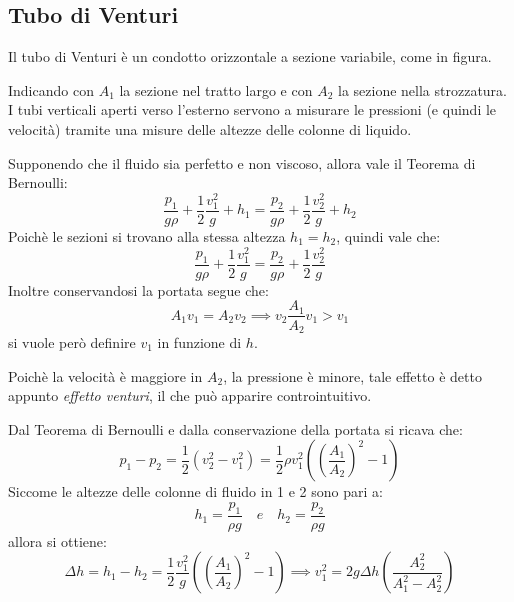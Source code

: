 \documentclass[11pt, a4paper, openright]{book}
\theoremstyle{plain}
\theoremstyle{definition}
\begin{document}
\newpage

\subsection{Tubo di Venturi}
Il tubo di Venturi è un condotto orizzontale a sezione variabile, come in figura.

Indicando con $A_1$ la sezione nel tratto largo e con $A_2$ la sezione nella strozzatura. I tubi verticali aperti verso l'esterno servono a misurare le pressioni (e quindi le velocità) tramite una misure delle altezze delle colonne di liquido.

Supponendo che il fluido sia perfetto e non viscoso, allora vale il Teorema di Bernoulli:
\begin{equation}
    \frac{p_1}{g\rho} + \frac{1}{2}\frac{v_1^2}{g} + h_1 =\frac{p_2}{g\rho} + \frac{1}{2}\frac{v_2^2}{g} + h_2
\end{equation}
Poichè le sezioni si trovano alla stessa altezza $h_1 = h_2$, quindi vale che:
\begin{equation}
    \frac{p_1}{g\rho} + \frac{1}{2}\frac{v_1^2}{g} = \frac{p_2}{g\rho} + \frac{1}{2}\frac{v_2^2}{g}
\end{equation}
Inoltre conservandosi la portata segue che:
\begin{equation}
    A_1v_1 = A_2v_2 \implies v_2 \frac{A_1}{A_2}v_1 > v_1
\end{equation}
si vuole però definire $v_1$ in funzione di $h$.

Poichè la velocità è maggiore in $A_2$, la pressione è minore, tale effetto è detto appunto \textit{effetto venturi}, il che può apparire controintuitivo.

Dal Teorema di Bernoulli e dalla conservazione della portata si ricava che:
\begin{equation}
    p_1 - p_2 = \frac{1}{2}(v_2^2 - v_1^2) = \frac{1}{2}\rho v_1^2 \left(\left(\frac{A_1}{A_2}\right)^2 - 1\right)
\end{equation}
Siccome le altezze delle colonne di fluido in 1 e 2 sono pari a:
\begin{equation}
    h_1 = \frac{p_1}{\rho g} \quad e \quad h_2 = \frac{p_2}{\rho g}
\end{equation}
allora si ottiene:
\begin{equation}
    \Delta h = h_1 - h_2 = \frac{1}{2}\frac{v_1^2}{g}\left(\left(\frac{A_1}{A_2}\right)^2 - 1\right) \implies v_1^2 = 2g\Delta h\left(\frac{A_2^2}{A_1^2 - A_2^2}\right)
\end{equation}
\end{document}
